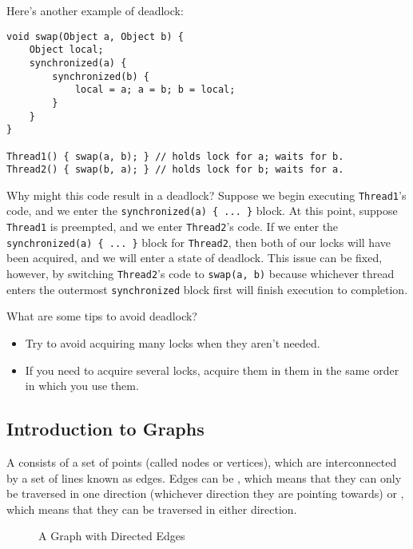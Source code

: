 Here's another example of deadlock:

\begin{lstlisting}
void swap(Object a, Object b) {
    Object local;
    synchronized(a) {
        synchronized(b) {
            local = a; a = b; b = local;
        }
    }
}

Thread1() { swap(a, b); } // holds lock for a; waits for b.
Thread2() { swap(b, a); } // holds lock for b; waits for a.
\end{lstlisting}

Why might this code result in a deadlock? Suppose we begin executing \verb!Thread1!'s code, and we enter the \verb!synchronized(a) { ... }! block. At this point, suppose \verb!Thread1! is preempted, and we enter \verb!Thread2!'s code. If we enter the \verb!synchronized(a) { ... }! block for \verb!Thread2!, then both of our locks will have been acquired, and we will enter a state of deadlock. This issue can be fixed, however, by switching \verb!Thread2!'s code to \verb!swap(a, b)! because whichever thread enters the outermost \verb!synchronized! block first will finish execution to completion. 


What are some tips to avoid deadlock?
\begin{itemize}
    \item Try to avoid acquiring many locks when they aren't needed.
    \item If you need to acquire several locks, acquire them in them in the same order in which you use them.
\end{itemize}


\subsection{Introduction to Graphs}

A  consists of a set of points (called nodes or vertices), which are interconnected by a set of lines known as edges. Edges can be , which means that they can only be traversed in one direction (whichever direction they are pointing towards) or , which means that they can be traversed in either direction.

\begin{figure}[h]
\centering
{}
\caption{A Graph with Directed Edges}
\end{figure}

